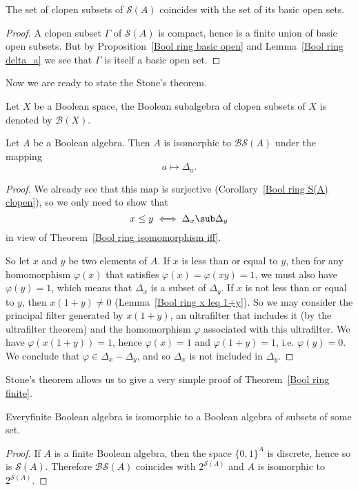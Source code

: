 \begin{corollary}\label{Bool ring S(A) clopen}
The set of clopen subsets of $\mathcal{S}(A)$ coincides with the set of its basic open sets.
\end{corollary}
\begin{proof}
A clopen subset $\Gamma$ of $\mathcal{S}(A)$ is compact, hence is a finite union of basic open subsets. But by Proposition~\ref{Bool ring basic open} and Lemma~\ref{Bool ring delta_a} we see that $\Gamma$ is itself 
a basic open set.
\end{proof}
Now we are ready to state the Stone's theorem.
\begin{definition}
Let $X$ be a Boolean space, the Boolean subalgebra of clopen subsets of $X$ is denoted by $\mathcal{B}(X)$. 
\end{definition}
\begin{theorem}
Let $A$ be a Boolean algebra. Then $A$ is isomorphic to $\mathcal{B}\mathcal{S}(A)$ under the mapping
\[a\mapsto\Delta_a.\]
\end{theorem}
\begin{proof}
We already see that this map is surjective (Corollary~\ref{Bool ring S(A) clopen}), so we only need to show that
\[x\leq y\iff \Delta_x\sub\Delta_y\]
in view of Theorem~\ref{Bool ring isomomorphism iff}.\par
So let $x$ and $y$ be two elements of $A$. If $x$ is less than or equal to $y$, then for any homomorphism $\varphi(x)$ that satisfies $\varphi(x)=\varphi(xy)=1$, we must also have $\varphi(y)=1$, 
which means that $\Delta_x$ is a subset of $\Delta_y$. If $x$ is not less than or equal to $y$, then $x(1+y)\neq0$ (Lemma~\ref{Bool ring x leq 1+y}). So we may consider the 
principal filter generated by $x(1+y)$, an ultrafilter that includes it (by the ultrafilter theorem) and the homomorphism $\varphi$ associated with this ultrafilter. We have $\varphi(x(1+y))=1$,
hence $\varphi(x)=1$ and $\varphi(1+y)=1$, i.e. $\varphi(y)=0$. We conclude that $\varphi\in\Delta_x-\Delta_y$, and so $\Delta_x$ is not included in $\Delta_y$.
\end{proof}
Stone's theorem allows us to give a very simple proof of Theorem~\ref{Bool ring finite}.
\begin{corollary}
Everyfinite Boolean algebra is isomorphic to a Boolean algebra of subsets of some set.
\end{corollary}
\begin{proof}
If $A$ is a finite Boolean algebra, then the space $\{0,1\}^A$ is discrete, hence so is $\mathcal{S}(A)$. Therefore $\mathcal{B}\mathcal{S}(A)$ coincides with $2^{\mathcal{S}(A)}$ and $A$ is isomorphic to $2^{\mathcal{S}(A)}$.
\end{proof}
